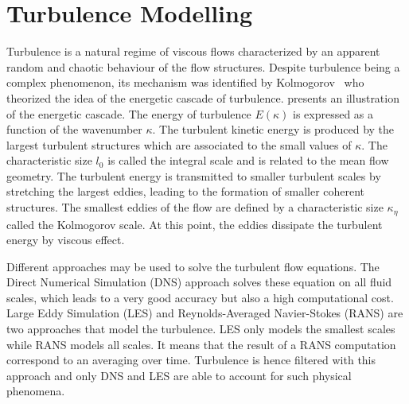 \section{Turbulence Modelling}

Turbulence is a natural regime of viscous flows characterized by an apparent random and chaotic behaviour of the flow structures. Despite turbulence being a complex phenomenon, its mechanism was identified by Kolmogorov~\cite{Kolmogorov1941} who theorized the idea of the energetic cascade of turbulence.  presents an illustration of the energetic cascade. The energy of turbulence $E(\kappa)$ is expressed as a function of the wavenumber $\kappa$. The turbulent kinetic energy is produced by the largest turbulent structures which are associated to the small values of $\kappa$. The characteristic size $l_0$ is called the integral scale and is related to the mean flow geometry. The turbulent energy is transmitted to smaller turbulent scales by stretching the largest eddies, leading to the formation of smaller coherent structures. The smallest eddies of the flow are defined by a characteristic size  $\kappa_\eta$ called the Kolmogorov scale. At this point, the eddies dissipate the turbulent energy by viscous effect.

Different approaches may be used to solve the turbulent flow equations. The Direct Numerical Simulation (DNS) approach solves these equation on all fluid scales, which leads to a very good accuracy but also a high computational cost. Large Eddy Simulation (LES) and Reynolds-Averaged Navier-Stokes (RANS) are two approaches that model the turbulence. LES only models the smallest scales while RANS models all scales. It means that the result of a RANS computation correspond to an averaging over time. Turbulence is hence filtered with this approach and only DNS and LES are able to account for such physical phenomena.


